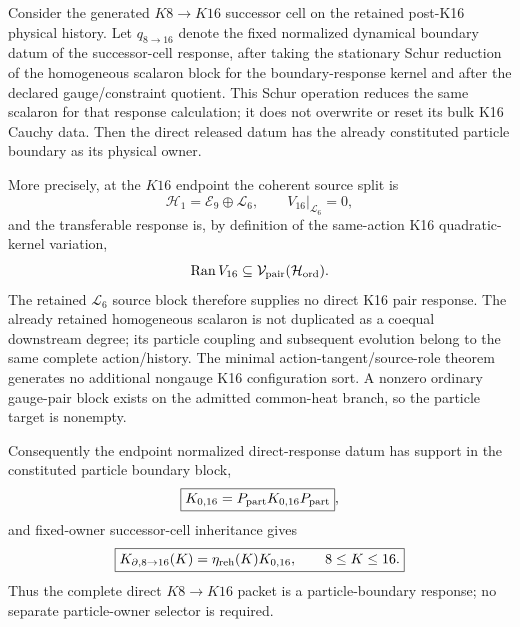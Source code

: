 \documentclass[12pt,a4paper]{article}
\begin{document}
\begin{theorem}
\label{p8:thm:v2136-k16-direct-particle-owner}
Consider the generated $K8\to K16$ successor cell on the retained post-K16
physical history.  Let $q_{8\to16}$ denote the fixed normalized dynamical
boundary datum of the successor-cell response, after taking the stationary
Schur reduction of the homogeneous scalaron block for the boundary-response
kernel and after the declared gauge/constraint quotient.  This Schur operation
reduces the same scalaron for that response calculation; it does not overwrite
or reset its bulk K16 Cauchy data.  Then the direct released datum has the
already constituted particle boundary as its physical owner.

More precisely, at the $K16$ endpoint the coherent source split is
\[
 \mathcal H_1=\mathcal E_9\oplus\mathcal L_6,
 \qquad V_{16}|_{\mathcal L_6}=0,
\]
and the transferable response is, by definition of the same-action K16
quadratic-kernel variation,
\[
 \operatorname{Ran}V_{16}
 \subseteq\mathcal V_{\rm pair}(\mathcal H_{\rm ord}).
\]
The retained $\mathcal L_6$ source block therefore supplies no direct K16 pair
response.  The already retained homogeneous scalaron is not duplicated as a
coequal downstream degree; its particle coupling and subsequent evolution belong
to the same complete action/history.  The minimal action-tangent/source-role theorem
generates no additional nongauge K16 configuration sort.  A nonzero ordinary
gauge-pair block exists on the admitted common-heat branch, so the particle
target is nonempty.

Consequently the endpoint normalized direct-response datum has support in the
constituted particle boundary block,
\[
 \boxed{K_{0,16}=P_{\rm part}K_{0,16}P_{\rm part}},
\]
and fixed-owner successor-cell inheritance gives
\[
 \boxed{
 K_{\partial,8\to16}(K)
 =\eta_{\rm reh}(K)K_{0,16},
 \qquad 8\le K\le16.}
\]
Thus the complete direct $K8\to K16$ packet is a particle-boundary response;
no separate particle-owner selector is required.
\end{theorem}
\end{document}
